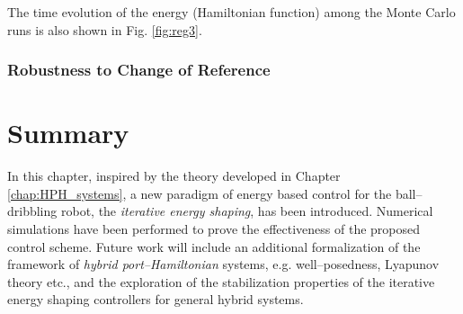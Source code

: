 The time evolution of the energy (Hamiltonian function) among the Monte Carlo runs is also shown in Fig. \ref{fig:reg3}.
%
\subsubsection{Robustness to Change of Reference}
%
\clearpage
\section{Summary}\label{sec:concl}
%
In this chapter, inspired by the theory developed in Chapter \ref{chap:HPH_systems}, a new paradigm of energy based control for the ball--dribbling robot, the \textit{iterative energy shaping}, has been introduced. Numerical simulations have been performed to prove the effectiveness of the proposed control scheme. Future work will include an additional formalization of the framework of \textit{hybrid port--Hamiltonian} systems, e.g. well--posedness, Lyapunov theory etc., and the exploration of the stabilization properties of the {iterative energy shaping} controllers for general hybrid systems.